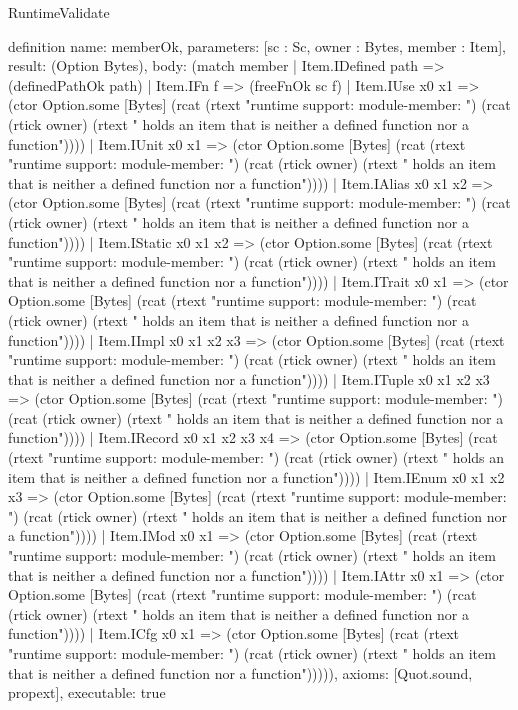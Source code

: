 \begin{lexlean}{RuntimeValidate}
\begin{semanticmodule}
definition{
  name: memberOk,
  parameters: [sc : Sc, owner : Bytes, member : Item],
  result: (Option Bytes),
  body: (match member
    | Item.IDefined path => (definedPathOk path)
    | Item.IFn f => (freeFnOk sc f)
    | Item.IUse x0 x1 => (ctor Option.some [Bytes] (rcat (rtext "runtime support: module-member: ") (rcat (rtick owner) (rtext " holds an item that is neither a defined function nor a function"))))
    | Item.IUnit x0 x1 => (ctor Option.some [Bytes] (rcat (rtext "runtime support: module-member: ") (rcat (rtick owner) (rtext " holds an item that is neither a defined function nor a function"))))
    | Item.IAlias x0 x1 x2 => (ctor Option.some [Bytes] (rcat (rtext "runtime support: module-member: ") (rcat (rtick owner) (rtext " holds an item that is neither a defined function nor a function"))))
    | Item.IStatic x0 x1 x2 => (ctor Option.some [Bytes] (rcat (rtext "runtime support: module-member: ") (rcat (rtick owner) (rtext " holds an item that is neither a defined function nor a function"))))
    | Item.ITrait x0 x1 => (ctor Option.some [Bytes] (rcat (rtext "runtime support: module-member: ") (rcat (rtick owner) (rtext " holds an item that is neither a defined function nor a function"))))
    | Item.IImpl x0 x1 x2 x3 => (ctor Option.some [Bytes] (rcat (rtext "runtime support: module-member: ") (rcat (rtick owner) (rtext " holds an item that is neither a defined function nor a function"))))
    | Item.ITuple x0 x1 x2 x3 => (ctor Option.some [Bytes] (rcat (rtext "runtime support: module-member: ") (rcat (rtick owner) (rtext " holds an item that is neither a defined function nor a function"))))
    | Item.IRecord x0 x1 x2 x3 x4 => (ctor Option.some [Bytes] (rcat (rtext "runtime support: module-member: ") (rcat (rtick owner) (rtext " holds an item that is neither a defined function nor a function"))))
    | Item.IEnum x0 x1 x2 x3 => (ctor Option.some [Bytes] (rcat (rtext "runtime support: module-member: ") (rcat (rtick owner) (rtext " holds an item that is neither a defined function nor a function"))))
    | Item.IMod x0 x1 => (ctor Option.some [Bytes] (rcat (rtext "runtime support: module-member: ") (rcat (rtick owner) (rtext " holds an item that is neither a defined function nor a function"))))
    | Item.IAttr x0 x1 => (ctor Option.some [Bytes] (rcat (rtext "runtime support: module-member: ") (rcat (rtick owner) (rtext " holds an item that is neither a defined function nor a function"))))
    | Item.ICfg x0 x1 => (ctor Option.some [Bytes] (rcat (rtext "runtime support: module-member: ") (rcat (rtick owner) (rtext " holds an item that is neither a defined function nor a function"))))),
  axioms: [Quot.sound, propext],
  executable: true
}


\end{semanticmodule}
\end{lexlean}
